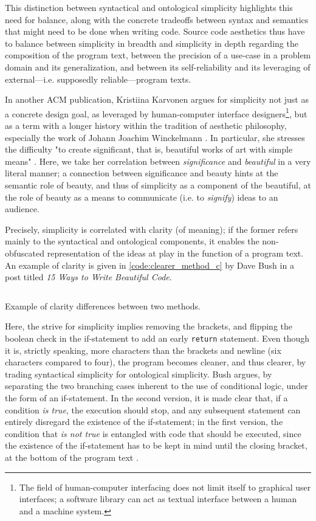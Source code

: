 This distinction between syntactical and ontological simplicity highlights this need for balance, along with the concrete tradeoffs between syntax and semantics that might need to be done when writing code. Source code aesthetics thus have to balance between simplicity in breadth and simplicity in depth regarding the composition of the program text, between the precision of a use-case in a problem domain and its generalization, and between its self-reliability and its leveraging of external—i.e. supposedly reliable—program texts. 

In another ACM publication, Kristiina Karvonen argues for simplicity not just as a concrete design goal, as leveraged by human-computer interface designers\footnote{The field of human-computer interfacing does not limit itself to graphical user interfaces; a software library can act as textual interface between a human and a machine system.}, but as a term with a longer history within the tradition of aesthetic philosophy, especially the work of Johann Joachim Winckelmann \citep{karvonen_beauty_2000}. In particular, she stresses the difficulty "to create significant, that is, beautiful works of art with simple means" \citep{karvonen_beauty_2000}. Here, we take her correlation between \emph{significance} and \emph{beautiful} in a very literal manner; a connection between significance and beauty hints at the semantic role of beauty, and thus of simplicity as a component of the beautiful, at the role of beauty as a means to communicate (i.e. to \emph{signify}) ideas to an audience.

Precisely, simplicity is correlated with clarity (of meaning); if the former refers mainly to the syntactical and ontological components, it enables the non-obfuscated representation of the ideas at play in the function of a program text. An example of clarity is given in \ref{code:clearer_method_c} by Dave Bush in a post titled  \emph{15 Ways to Write Beautiful Code}.

\begin{listing}
  \inputminted{c}{./corpus/clearer_method.c}
  \caption{Example of clarity differences between two methods.}
  \label{code:clearer_method_c}
\end{listing}

Here, the strive for simplicity implies removing the brackets, and flipping the boolean check in the if-statement to add an early \lstinline{return} statement. Even though it is, strictly speaking, more characters than the brackets and newline (six characters compared to four), the program becomes cleaner, and thus clearer, by trading syntactical simplicity for ontological simplicity. Bush argues, by separating the two branching cases inherent to the use of conditional logic, under the form of an if-statement. In the second version, it is made clear that, if a condition \emph{is true}, the execution should stop, and any subsequent statement can entirely disregard the existence of the if-statement; in the first version, the condition that \emph{is not true} is entangled with code that should be executed, since the existence of the if-statement has to be kept in mind until the closing bracket, at the bottom of the program text \citep{bush_15_2015}.

